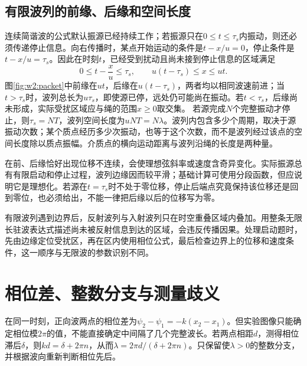 \subsection{有限波列的前缘、后缘和空间长度}
连续简谐波的公式默认振源已经持续工作；若振源只在$0\le t\le\tau_s$内振动，则还必须传递停止信息。向右传播时，某点开始运动的条件是$t-x/u=0$，停止条件是$t-x/u=\tau_s$。因此在时刻$t$，已经受到扰动且尚未接到停止信息的区域满足
\[
0\le t-\frac xu\le\tau_s,\qquad u(t-\tau_s)\le x\le ut.
\]
图\ref{fig:w2:packet}中前缘在$ut$，后缘在$u(t-\tau_s)$，两者均以相同波速前进；当$t>\tau_s$时，波列总长为$u\tau_s$，即使源已停，远处仍可能尚在振动。若$t<\tau_s$，后缘尚未形成，实际受扰区域应与绳的范围$x\ge0$取交集。
若源完成$N$个完整振动才停止，则$\tau_s=NT$，波列空间长度为$uNT=N\lambda$。波列内包含多少个周期，取决于源振动次数；某个质点经历多少次振动，也等于这个次数，而不是波列经过该点的空间长度除以质点振幅。介质点的横向运动距离与波列沿绳的长度是两种量。

在前、后缘恰好出现位移不连续，会使理想弦斜率或速度含奇异变化。实际振源总有有限启动和停止过程，波列边缘因而较平滑；基础计算可使用分段函数，但应说明它是理想化。若源在$t=\tau_s$时不处于零位移，停止后端点究竟保持该位移还是回到零位，也必须给出，不能一律把后缘以后的位移写为零。

有限波列遇到边界后，反射波列与入射波列只在时空重叠区域内叠加。用整条无限长驻波表达式描述尚未被反射信息到达的区域，会违反传播因果。处理启动题时，先由边缘定位受扰区，再在区内使用相位公式，最后检查边界上的位移和速度条件，这一顺序与无限波的参数识别不同。

\section{相位差、整数分支与测量歧义}
在同一时刻，正向波两点的相位差为$\psi_2-\psi_1=-k(x_2-x_1)$。但实验图像只能确定相位模$2\pi$的值，不能直接确定中间隔了几个完整波长。若两点相距$d$，测得相位滞后$\delta$，则$kd=\delta+2\pi n$，从而$\lambda=2\pi d/(\delta+2\pi n)$。只保留使$\lambda>0$的整数分支，并根据波向重新判断相位先后。


